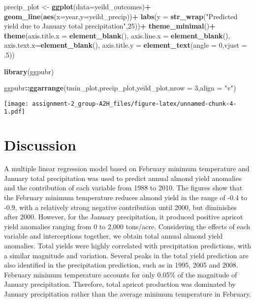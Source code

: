 \documentclass[
]{article}
\newenvironment{Shaded}{\begin{snugshade}}{\end{snugshade}}
\newcommand{\DataTypeTok}[1]{\textcolor[rgb]{0.13,0.29,0.53}{#1}}
\newcommand{\DecValTok}[1]{\textcolor[rgb]{0.00,0.00,0.81}{#1}}
\newcommand{\FloatTok}[1]{\textcolor[rgb]{0.00,0.00,0.81}{#1}}
\newcommand{\KeywordTok}[1]{\textcolor[rgb]{0.13,0.29,0.53}{\textbf{#1}}}
\newcommand{\NormalTok}[1]{#1}
\newcommand{\OperatorTok}[1]{\textcolor[rgb]{0.81,0.36,0.00}{\textbf{#1}}}
\newcommand{\StringTok}[1]{\textcolor[rgb]{0.31,0.60,0.02}{#1}}
\begin{document}
\begin{Shaded}
\begin{Highlighting}[]
\NormalTok{precip_plot <-}\StringTok{ }\KeywordTok{ggplot}\NormalTok{(}\DataTypeTok{data=}\NormalTok{yeild_outcomes)}\OperatorTok{+}
\StringTok{  }\KeywordTok{geom_line}\NormalTok{(}\KeywordTok{aes}\NormalTok{(}\DataTypeTok{x=}\NormalTok{year,}\DataTypeTok{y=}\NormalTok{yeild_precip))}\OperatorTok{+}
\StringTok{  }\KeywordTok{labs}\NormalTok{(}\DataTypeTok{y =} \KeywordTok{str_wrap}\NormalTok{(}\StringTok{"Predicted yield due to January total precipitation"}\NormalTok{,}\DecValTok{25}\NormalTok{))}\OperatorTok{+}
\StringTok{  }\KeywordTok{theme_minimal}\NormalTok{()}\OperatorTok{+}
\StringTok{  }\KeywordTok{theme}\NormalTok{(}\DataTypeTok{axis.title.x =} \KeywordTok{element_blank}\NormalTok{(),}
        \DataTypeTok{axis.line.x =} \KeywordTok{element_blank}\NormalTok{(),}
        \DataTypeTok{axis.text.x=}\KeywordTok{element_blank}\NormalTok{(),}
        \DataTypeTok{axis.title.y =} \KeywordTok{element_text}\NormalTok{(}\DataTypeTok{angle =} \DecValTok{0}\NormalTok{,}\DataTypeTok{vjust =} \FloatTok{.5}\NormalTok{))}
\end{Highlighting}
\end{Shaded}

\begin{Shaded}
\begin{Highlighting}[]
\KeywordTok{library}\NormalTok{(ggpubr)}

\NormalTok{ggpubr}\OperatorTok{::}\KeywordTok{ggarrange}\NormalTok{(tmin_plot,precip_plot,yeild_plot,}\DataTypeTok{nrow =} \DecValTok{3}\NormalTok{,}\DataTypeTok{align =} \StringTok{"v"}\NormalTok{)}
\end{Highlighting}
\end{Shaded}

\texttt{[image: assignment-2\_group-A2H\_files/figure-latex/unnamed-chunk-4-1.pdf]}

\hypertarget{discussion}{%
\section{Discussion}\label{discussion}}

A multiple linear regression model based on February minimum temperature
and January total precipitation was used to predict annual almond yield
anomalies and the contribution of each variable from 1988 to 2010. The
figures show that the February minimum temperature reduces almond yield
in the range of -0.4 to -0.9, with a relatively strong negative
contribution until 2000, but diminishes after 2000. However, for the
January precipitation, it produced positive apricot yield anomalies
ranging from 0 to 2,000 tons/acre. Considering the effects of each
variable and interceptions together, we obtain total annual almond yield
anomalies. Total yields were highly correlated with precipitation
predictions, with a similar magnitude and variation. Several peaks in
the total yield prediction are also identified in the precipitation
prediction, such as in 1995, 2005 and 2008. February minimum temperature
accounts for only 0.05\% of the magnitude of January precipitation.
Therefore, total apricot production was dominated by January
precipitation rather than the average minimum temperature in February.
\end{document}
